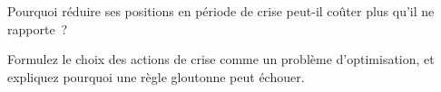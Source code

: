 \begin{interviewq}\label{iq:fm:crisis-management:5}
Pourquoi réduire ses positions en période de crise peut-il coûter plus qu'il ne rapporte~?
\end{interviewq}

\begin{interviewq}\label{iq:fm:crisis-management:6}
Formulez le choix des actions de crise comme un problème d'optimisation, et expliquez pourquoi une règle gloutonne peut échouer.
\end{interviewq}

